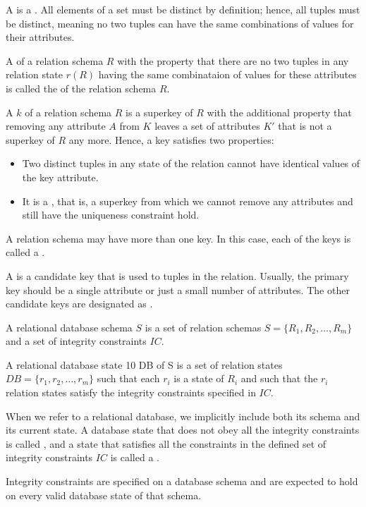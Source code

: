     \par A  is a . All elements of a set must be distinct by definition; hence, all tuples must be distinct, meaning no two tuples can have the same combinations of values for  their attributes.
    \par A  of a relation schema $R$ with the property that there are no two tuples in any relation state $r(R)$ having the same combinataion of values for these attributes is called the  of the relation schema $R$.
    \par A  $k$ of a relation schema $R$ is a superkey of $R$ with the additional property that removing any attribute $A$ from $K$ leaves a set of attributes $K'$ that is not a superkey of $R$ any more. Hence, a key satisfies two properties:
    \begin{itemize}
      \item Two distinct tuples in any state of the relation cannot have identical values
        of the key attribute.
      \item It is a , that is, a superkey from which we cannot remove
any attributes and still have the uniqueness constraint hold.
    \end{itemize}
    \par A relation schema may have more than one key. In this case, each of the keys is called a .
    \par A  is a candidate key that is used to  tuples in the relation. Usually, the primary key should be a single attribute or just a small number of attributes. The other candidate keys are designated as .

    \par A relational database schema $S$ is a set of relation schemas $S = \{R_1, R_2, \ldots, R_m\}$ and a set of integrity constraints $IC$.
    \par A relational database state 10 DB of S is a set of relation states $DB = \{r_1, r_2, \ldots, r_m\}$ such that each $r_i$ is a state of $R_i$ and such that the $r_i$ relation states satisfy the integrity constraints specified in $IC$.
    \par When we refer to a relational database, we implicitly include both its schema and its
    current state. A database state that does not obey all the integrity constraints is called , and a state that satisfies all the constraints in the defined set of
integrity constraints $IC$ is called a .
    \par Integrity constraints are specified on a database schema and are expected to hold on
    every valid database state of that schema.

